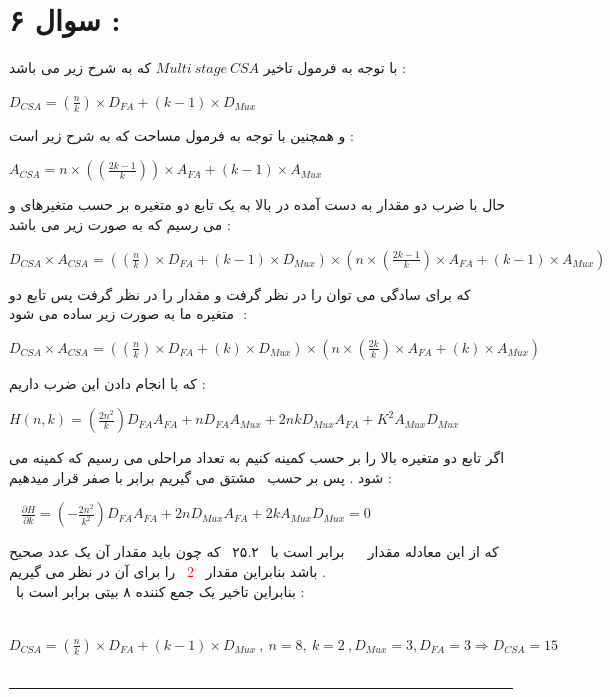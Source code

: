 \documentclass{article}
\begin{document}
\section*{سوال ۶ : }
با توجه به فرمول تاخیر 
$Multi \ stage \ CSA $
که به شرح زیر می باشد  : 
\begin{center}
	$ D_{CSA} = (\frac{n}{k})\times D_{FA} + (k-1)\times D_{Mux}$
\end{center}
و همچنین با توجه به فرمول مساحت که به شرح زیر است : 
\begin{center}
	$ A_{CSA} = n \times ((\frac{2k-1}{k}))\times A_{FA} + (k-1) \times A_{Mux}$
\end{center}
حال با ضرب دو مقدار به دست آمده در بالا به یک تابع دو متغیره بر حسب متغیرهای 
و  
می رسیم که به صورت زیر می باشد  : 
\begin{center}
	$D_{CSA} \times A_{CSA} = ((\frac{n}{k})\times D_{FA} + (k-1) \times D_{Mux}) \times (n \times (\frac{2k-1}{k}) \times A_{FA} + (k-1) \times A_{Mux})  $
\end{center}
که برای سادگی می توان 
را 
در نظر گرفت و مقدار 
را 
در نظر گرفت پس تابع دو متغیره ما به صورت زیر ساده می شود  ‌ :
\begin{center}
	$D_{CSA} \times A_{CSA} = ((\frac{n}{k})\times D_{FA} + (k) \times D_{Mux}) \times (n \times (\frac{2k}{k}) \times A_{FA} + (k) \times A_{Mux}) $
\end{center}
که با انجام دادن این ضرب داریم : 
\begin{center}
	$H(n , k ) =  (\frac{2n^2}{k}) D_{FA} A_{FA} + nD_{FA}A_{Mux} + 2nk D_{Mux}A_{FA} + K^2A_{Mux}D_{Mux}$
\end{center}
اگر تابع دو متغیره بالا را بر حسب 
کمینه کنیم به تعداد مراحلی می رسیم که 
کمینه می شود  . پس بر حسب 
 مشتق می گیریم برابر با صفر قرار میدهیم : 
 \begin{center}
 	$\frac{\partial H}{\partial  k} = (-\frac{2n^2}{k^2})D_{FA}A_{FA} + 2nD_{Mux}A_{FA} + 2kA_{Mux}D_{Mux} =0    $
 \end{center}
که از این معادله مقدار 
 برابر است با 
 ۲۵.۲
 که چون باید مقدار آن یک عدد صحیح باشد بنابراین مقدار 
 \textcolor{red}{2}
 را برای آن در نظر می گیریم  . \\
 بنابراین تاخیر یک جمع کننده ۸ بیتی برابر است با :
 \begin{center}
 	$D_{CSA} = (\frac{n}{k})\times D_{FA} + (k-1) \times D_{Mux}  \  , \ n = 8 , \ k = 2 \  , D_{Mux} = 3  ,D_{FA} = 3 \Rightarrow D_{CSA} = 15$
 \end{center}
\hrule
\end{document}
